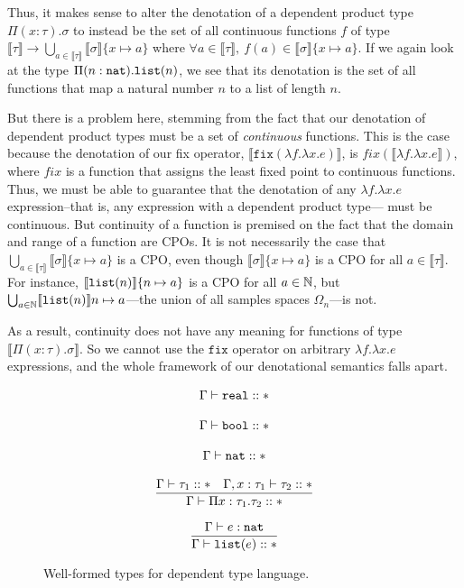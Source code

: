 Thus, it makes sense to alter the denotation of a dependent product type $\Pi(x:\tau).\sigma$ to instead be the set of all
continuous functions $f$ 
of type $\llbracket \tau \rrbracket \rightarrow \bigcup_{a \in \llbracket \tau \rrbracket} \llbracket \sigma \rrbracket\{x \mapsto a\}$
where $\forall a \in \llbracket \tau \rrbracket, \ f(a) \in \llbracket \sigma \rrbracket\{x \mapsto a\}$. If we again look at the 
type $\Pi(n:\texttt{nat}).\texttt{list}(n)$, we see that its denotation is the set of all functions that map a natural number $n$ 
to a list of length $n$.

But there is a problem here, stemming from the fact that our denotation of dependent product types must be a 
set of \emph{continuous} functions. This is the case because the denotation of our fix operator,
$\llbracket \texttt{fix}(\lambda f. \lambda x.e) \rrbracket$, is $fix(\llbracket \lambda f. \lambda x.e \rrbracket)$, where $fix$ 
is a function that assigns the least fixed point to continuous functions. Thus, we must be able to guarantee that the denotation of any $\lambda f. \lambda x.e$ expression--that is, any expression with a dependent product type--- must be continuous. But continuity of a function is premised on the fact that the domain and range of
a function are CPOs. It is not necessarily the case that
 $\bigcup_{a \in \llbracket \tau \rrbracket} \llbracket \sigma \rrbracket\{ x \mapsto a\}$ is a CPO, even though 
 $\llbracket \sigma \rrbracket\{x\mapsto a\}$ is a CPO for all $a \in \llbracket \tau \rrbracket$.
 For instance, $\llbracket \texttt{list}(n) \rrbracket\{n \mapsto a\}$ is a CPO for all $a \in \mathbb{N}$, but 
 $\bigcup_{a \in \mathbb{N}} \llbracket\texttt{list}(n)\rrbracket{n \mapsto a}$---the union of all samples spaces $\Omega_n$---is not. 

As a result, continuity does not have any meaning for functions of type $\llbracket \Pi (x: \tau).\sigma \rrbracket$. 
So we cannot use the $\texttt{fix}$ operator on arbitrary $\lambda f. \lambda x.e$ expressions, and the whole
framework of our denotational semantics falls apart. 
 
 \begin{figure}
\[
\begin{array}{c}
\Gamma \vdash \texttt{real} :: * \\ \\
\Gamma \vdash \texttt{bool} :: *\\ \\
\Gamma \vdash \texttt{nat} :: * \\ \\ 
\dfrac{\Gamma \vdash \tau_1 :: * \ \ \ \Gamma, x:\tau_1 \vdash \tau_2 :: *}{\Gamma \vdash \Pi x:\tau_1.\tau_2 :: *} \\ \\
\dfrac{\Gamma \vdash e : \texttt{nat}}{\Gamma \vdash \texttt{list}(e) :: *} 
\end{array}
\]
\caption{Well-formed types for dependent type language.}
\end{figure}

